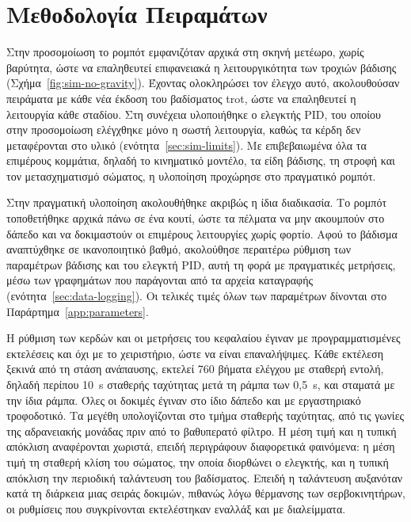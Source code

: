 \documentclass[11pt]{report}
\begin{document}
\section{Μεθοδολογία Πειραμάτων}
\label{sec:experiment-method}
Στην προσομοίωση το ρομπότ εμφανιζόταν αρχικά στη σκηνή μετέωρο, χωρίς
βαρύτητα, ώστε να επαληθευτεί επιφανειακά η λειτουργικότητα των τροχιών
βάδισης (Σχήμα~\ref{fig:sim-no-gravity}). Έχοντας ολοκληρώσει τον έλεγχο αυτό,
ακολουθούσαν πειράματα με κάθε νέα έκδοση του βαδίσματος trot, ώστε να
επαληθευτεί η λειτουργία κάθε σταδίου. Στη συνέχεια υλοποιήθηκε ο ελεγκτής PID,
του οποίου στην προσομοίωση ελέγχθηκε μόνο η σωστή λειτουργία, καθώς τα κέρδη
δεν μεταφέρονται στο υλικό (ενότητα~\ref{sec:sim-limits}). Με επιβεβαιωμένα όλα
τα επιμέρους κομμάτια, δηλαδή το κινηματικό μοντέλο, τα είδη βάδισης, τη στροφή
και τον μετασχηματισμό σώματος, η υλοποίηση προχώρησε στο πραγματικό ρομπότ.

Στην πραγματική υλοποίηση ακολουθήθηκε ακριβώς η ίδια διαδικασία. Το ρομπότ
τοποθετήθηκε αρχικά πάνω σε ένα κουτί, ώστε τα πέλματα να μην ακουμπούν στο
δάπεδο και να δοκιμαστούν οι επιμέρους λειτουργίες χωρίς φορτίο. Αφού το
βάδισμα αναπτύχθηκε σε ικανοποιητικό βαθμό, ακολούθησε περαιτέρω ρύθμιση των
παραμέτρων βάδισης και του ελεγκτή PID, αυτή τη φορά με πραγματικές μετρήσεις,
μέσω των γραφημάτων που παράγονται από τα αρχεία καταγραφής
(ενότητα~\ref{sec:data-logging}). Οι τελικές τιμές όλων των παραμέτρων δίνονται
στο Παράρτημα~\ref{app:parameters}.

Η ρύθμιση των κερδών και οι μετρήσεις του κεφαλαίου έγιναν με προγραμματισμένες
εκτελέσεις και όχι με το χειριστήριο, ώστε να είναι επαναλήψιμες. Κάθε εκτέλεση
ξεκινά από τη στάση ανάπαυσης, εκτελεί 760 βήματα ελέγχου με σταθερή εντολή,
δηλαδή περίπου 10~s σταθερής ταχύτητας μετά τη ράμπα των 0,5~s, και σταματά με
την ίδια ράμπα. Όλες οι δοκιμές έγιναν στο ίδιο δάπεδο και με εργαστηριακό
τροφοδοτικό. Τα μεγέθη υπολογίζονται στο τμήμα σταθερής ταχύτητας, από τις
γωνίες της αδρανειακής μονάδας πριν από το βαθυπερατό φίλτρο. Η μέση τιμή και η
τυπική απόκλιση αναφέρονται χωριστά, επειδή περιγράφουν διαφορετικά φαινόμενα: η
μέση τιμή τη σταθερή κλίση του σώματος, την οποία διορθώνει ο ελεγκτής, και η
τυπική απόκλιση την περιοδική ταλάντευση του βαδίσματος. Επειδή η ταλάντευση
αυξανόταν κατά τη διάρκεια μιας σειράς δοκιμών, πιθανώς λόγω θέρμανσης των
σερβοκινητήρων, οι ρυθμίσεις που συγκρίνονται εκτελέστηκαν εναλλάξ και με
διαλείμματα.
\end{document}

